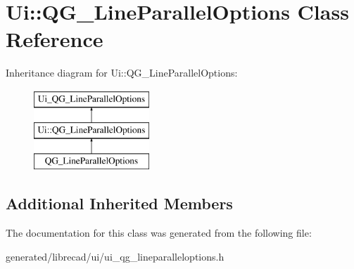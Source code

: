 \hypertarget{classUi_1_1QG__LineParallelOptions}{\section{Ui\-:\-:Q\-G\-\_\-\-Line\-Parallel\-Options Class Reference}
\label{classUi_1_1QG__LineParallelOptions}
}
Inheritance diagram for Ui\-:\-:Q\-G\-\_\-\-Line\-Parallel\-Options\-:\begin{figure}[H]
\begin{center}
\leavevmode
\includegraphics[height=3.000000cm]{classUi_1_1QG__LineParallelOptions}
\end{center}
\end{figure}
\subsection*{Additional Inherited Members}


The documentation for this class was generated from the following file\-:\begin{DoxyCompactItemize}
\item 
generated/librecad/ui/ui\-\_\-qg\-\_\-lineparalleloptions.\-h\end{DoxyCompactItemize}
